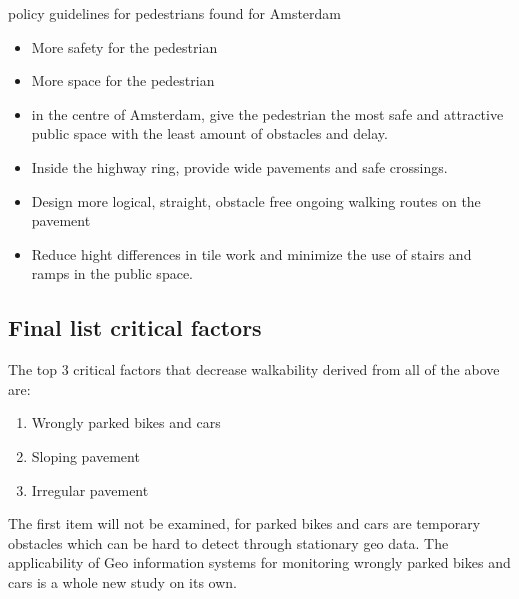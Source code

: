 policy guidelines for pedestrians found for Amsterdam

\begin{itemize}
\item More safety for the pedestrian~\cite{Bossink2011}
\item More space for the pedestrian~\cite{Bossink2011}
\item in the centre of Amsterdam, give the pedestrian the most safe and attractive public space with the least amount of obstacles and delay.~\cite{Kuik2013}
\item Inside the highway ring, provide wide pavements and safe crossings.~\cite{Kuik2013}
\item Design more logical, straight, obstacle free ongoing walking routes on the pavement~\cite{puccini2014}
\item Reduce hight differences in tile work and minimize the use of stairs and ramps in the public space.~\cite{puccini2014}
\end{itemize}




\subsection{Final list critical factors}\label{Rfinallist}
The top 3 critical factors that decrease walkability derived from all of the above are: 
\begin{enumerate}
\item Wrongly parked bikes and cars
\item Sloping pavement
\item Irregular pavement
\end{enumerate}

The first item will not be examined, for parked bikes and cars are temporary obstacles which can be hard to detect through stationary geo data. The applicability of Geo information systems for monitoring wrongly parked bikes and cars is a whole new study on its own.


